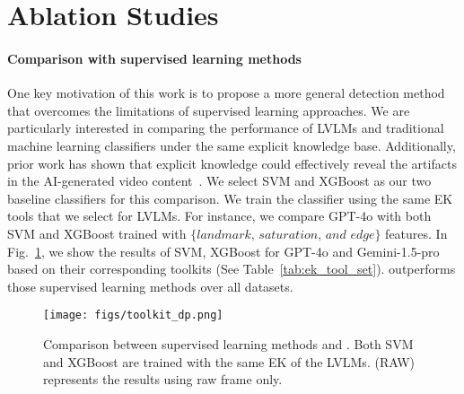 \section{Ablation Studies}

\label{sec:abalation}

\paragraph{Comparison with supervised learning methods}

One key motivation of this work is to propose a more general detection method that overcomes the limitations of supervised learning approaches. We are particularly interested in comparing the performance of LVLMs and traditional machine learning classifiers under the same explicit knowledge base.
Additionally, prior work has shown that explicit knowledge could effectively reveal the artifacts in the AI-generated video content~\cite{chang2024mattersaigeneratedvideos}.
We select SVM and XGBoost as our two baseline classifiers for this comparison. We train the classifier using the same EK tools that we select for LVLMs. For instance, we compare GPT-4o with both SVM and XGBoost trained with $\textit{\{landmark, saturation, and edge\}}$ features. In Fig.~\ref{fig:toolkit_dp}, we show the results of SVM, XGBoost for GPT-4o  and Gemini-1.5-pro based on their corresponding toolkits (See Table~\ref{tab:ek_tool_set}). \lavid outperforms those supervised learning methods over all datasets. 


\begin{figure}[h]
    \centering
    \texttt{[image: figs/toolkit\_dp.png]} %
     \vspace{-2mm}
    \caption{Comparison between supervised learning methods and \lavid. Both SVM and XGBoost are trained with the same EK of the LVLMs. (RAW) represents the results using raw frame only.}
    \label{fig:toolkit_dp}
\end{figure}


